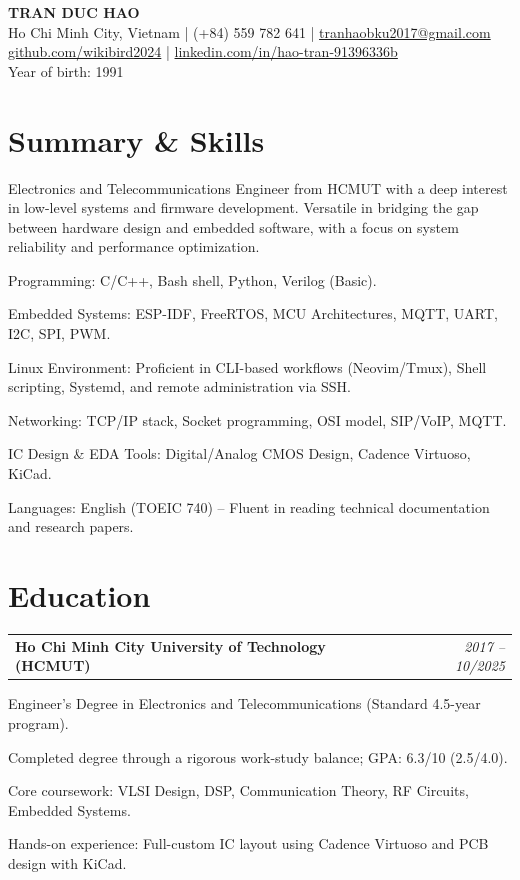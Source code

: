 \documentclass[11pt, a4paper]{article}
\makeatletter
\newcommand{\entryheader}[2]{
    \noindent\begin{tabularx}{\textwidth}{@{}X r@{}}
        \textbf{#1} & \textit{#2} \\
    \end{tabularx}\vspace{-2pt}
}
\makeatother
\begin{document}
\begin{center}
    {\Huge \textbf{TRAN DUC HAO}} \\ \vspace{6pt}
    \small
    \faMapMarker* Ho Chi Minh City, Vietnam \quad | \quad
    \faPhone* (+84) 559 782 641 \quad | \quad
    \faEnvelope \href{mailto:tranhaobku2017@gmail.com}{ tranhaobku2017@gmail.com} \\ \vspace{2pt}
    \faGithub \href{https://github.com/wikibird2024}{ github.com/wikibird2024} \quad | \quad
    \faLinkedin \href{https://www.linkedin.com/in/hao-tran-91396336b/}{ linkedin.com/in/hao-tran-91396336b} \\
    \small Year of birth: 1991
\end{center}

\section{Summary \& Skills}
\noindent Electronics and Telecommunications Engineer from HCMUT with a deep interest in low-level systems and firmware development. Versatile in bridging the gap between hardware design and embedded software, with a focus on system reliability and performance optimization.
\begin{highlights}
    \item Programming: C/C++, Bash shell, Python, Verilog (Basic).
    \item Embedded Systems: ESP-IDF, FreeRTOS, MCU Architectures, MQTT, UART, I2C, SPI, PWM.
    \item Linux Environment: Proficient in CLI-based workflows (Neovim/Tmux), Shell scripting, Systemd, and remote administration via SSH.
    \item Networking: TCP/IP stack, Socket programming, OSI model, SIP/VoIP, MQTT.
    \item IC Design \& EDA Tools: Digital/Analog CMOS Design, Cadence Virtuoso, KiCad.
    \item Languages: English (TOEIC 740) – Fluent in reading technical documentation and research papers.
\end{highlights}

\section{Education}
\entryheader{Ho Chi Minh City University of Technology (HCMUT)}{2017 -- 10/2025}
\begin{highlights}
    \item Engineer's Degree in Electronics and Telecommunications (Standard 4.5-year program).
    \item Completed degree through a rigorous work-study balance; GPA: 6.3/10 (2.5/4.0).
    \item Core coursework: VLSI Design, DSP, Communication Theory, RF Circuits, Embedded Systems.
    \item Hands-on experience: Full-custom IC layout using Cadence Virtuoso and PCB design with KiCad.
\end{highlights}
\end{document}
